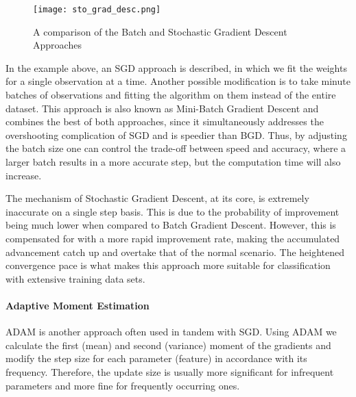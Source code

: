 		\begin{figure}[H]
			\centering
			\captionsetup{width=0.8\textwidth}
			\texttt{[image: sto\_grad\_desc.png]}
			\caption[Batch and Stochastic Gradient Descent]{
				\footnotesize{
					A comparison of the Batch and Stochastic Gradient Descent Approaches 
				}
			} 
			\label{ann_sto_grad_desc}
		\end{figure}
	
		In the example above, an SGD approach is described, in which we fit the weights for a single observation at a time. Another possible modification is to take minute batches of observations and fitting the algorithm on them instead of the entire dataset. This approach is also known as Mini-Batch Gradient Descent and combines the best of both approaches, since it simultaneously addresses the overshooting complication of SGD and is speedier than BGD. Thus, by adjusting the batch size one can control the trade-off between speed and accuracy, where a larger batch results in a more accurate step, but the computation time will also increase. 
		
		\par
		
		The mechanism of Stochastic Gradient Descent, at its core, is extremely inaccurate on a single step basis. This is due to the probability of improvement being much lower when compared to Batch Gradient Descent. However, this is compensated for with a more rapid improvement rate, making the accumulated advancement catch up and overtake that of the normal scenario. The heightened convergence pace is what makes this approach more suitable for classification with extensive training data sets.
		
	\paragraph{Adaptive Moment Estimation}
		ADAM is another approach often used in tandem with SGD. Using ADAM we calculate the first (mean) and second (variance) moment of the gradients and modify the step size for each parameter (feature) in accordance with its frequency. Therefore, the update size is usually more significant for infrequent parameters and more fine for frequently occurring ones.
			
		 

				
				